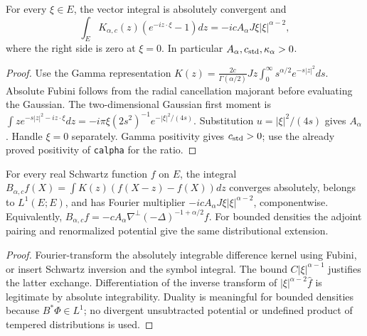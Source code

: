 \begin{lemma}
  \label{lem:c13_kernel_symbol}
  For every $\xi\in E$, the vector integral is absolutely convergent and
  \[
    \int_E K_{\alpha,c}(z)(e^{-iz\cdot\xi}-1)dz
       =-icA_\alpha J\xi|\xi|^{\alpha-2},
  \]
  where the right side is zero at $\xi=0$. In particular $A_\alpha,c_{\rm std},\kappa_\alpha>0$.
\end{lemma}
\begin{proof}
  Use the Gamma representation
  $K(z)=\frac{2c}{\Gamma(\alpha/2)}Jz\int_0^\infty s^{\alpha/2}e^{-s|z|^2}ds$.
  Absolute Fubini follows from the radial cancellation majorant before evaluating the Gaussian.
  The two-dimensional Gaussian first moment is
  $\int z e^{-s|z|^2-i z\cdot\xi}dz=-i\pi\xi(2s^2)^{-1}e^{-|\xi|^2/(4s)}$.
  Substitution $u=|\xi|^2/(4s)$ gives $A_\alpha$. Handle $\xi=0$ separately.
  Gamma positivity gives $c_{\rm std}>0$; use the already proved positivity of \texttt{calpha} for the ratio.
\end{proof}

\begin{lemma}
  \label{lem:c13_fourier_identification}
  For every real Schwartz function $f$ on $E$, the integral
  $B_{\alpha,c}f(X)=\int K(z)(f(X-z)-f(X))dz$ converges absolutely, belongs to $L^1(E;E)$,
  and has Fourier multiplier $-icA_\alpha J\xi|\xi|^{\alpha-2}$, componentwise.
  Equivalently,
  $B_{\alpha,c}f=-cA_\alpha\nabla^\perp(-\Delta)^{-1+\alpha/2}f$.
  For bounded densities the adjoint pairing and renormalized potential give the same distributional extension.
\end{lemma}
\begin{proof}
  Fourier-transform the absolutely integrable difference kernel using Fubini, or insert Schwartz
  inversion and the symbol integral. The bound $C|\xi|^{\alpha-1}$ justifies the latter exchange.
  Differentiation of the inverse transform of $|\xi|^{\alpha-2}\widehat f$ is legitimate by absolute
  integrability. Duality is meaningful for bounded densities because $B^*\Phi\in L^1$;
  no divergent unsubtracted potential or undefined product of tempered distributions is used.
\end{proof}


